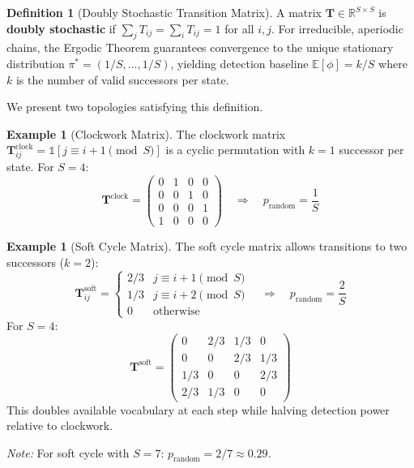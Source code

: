 \documentclass[11pt]{article}
\theoremstyle{definition}
\newtheorem{definition}[theorem]{Definition}
\newtheorem{example}[theorem]{Example}
\theoremstyle{remark}
\begin{document}
\begin{definition}[Doubly Stochastic Transition Matrix]
\label{def:doubly_stochastic}
A matrix $\mathbf{T} \in \mathbb{R}^{S \times S}$ is \textbf{doubly stochastic} if $\sum_{j} T_{ij} = \sum_{i} T_{ij} = 1$ for all $i,j$. For irreducible, aperiodic chains, the Ergodic Theorem guarantees convergence to the unique stationary distribution $\pi^* = (1/S, \ldots, 1/S)$, yielding detection baseline $\mathbb{E}[\phi] = k/S$ where $k$ is the number of valid successors per state.
\end{definition}

We present two topologies satisfying this definition.

\begin{example}[Clockwork Matrix]
\label{ex:clockwork}
The clockwork matrix $\mathbf{T}^{\text{clock}}_{ij} = \mathbb{1}[j \equiv i{+}1 \pmod{S}]$ is a cyclic permutation with $k=1$ successor per state. For $S=4$:
$$\mathbf{T}^{\text{clock}} = \begin{pmatrix} 0 & 1 & 0 & 0 \\ 0 & 0 & 1 & 0 \\ 0 & 0 & 0 & 1 \\ 1 & 0 & 0 & 0 \end{pmatrix} \quad \Rightarrow \quad p_{\text{random}} = \frac{1}{S}$$
\end{example}

\begin{example}[Soft Cycle Matrix]
\label{ex:softcycle}
The soft cycle matrix allows transitions to two successors ($k=2$):
$$\mathbf{T}^{\text{soft}}_{ij} = \begin{cases}
2/3 & j \equiv i{+}1 \pmod{S} \\
1/3 & j \equiv i{+}2 \pmod{S} \\
0 & \text{otherwise}
\end{cases} \quad \Rightarrow \quad p_{\text{random}} = \frac{2}{S}$$
For $S=4$:
$$\mathbf{T}^{\text{soft}} = \begin{pmatrix} 0 & 2/3 & 1/3 & 0 \\ 0 & 0 & 2/3 & 1/3 \\ 1/3 & 0 & 0 & 2/3 \\ 2/3 & 1/3 & 0 & 0 \end{pmatrix}$$
This doubles available vocabulary at each step while halving detection power relative to clockwork.
\end{example}

\noindent\textit{Note:} For soft cycle with $S=7$: $p_{\text{random}} = 2/7 \approx 0.29$.
\end{document}
